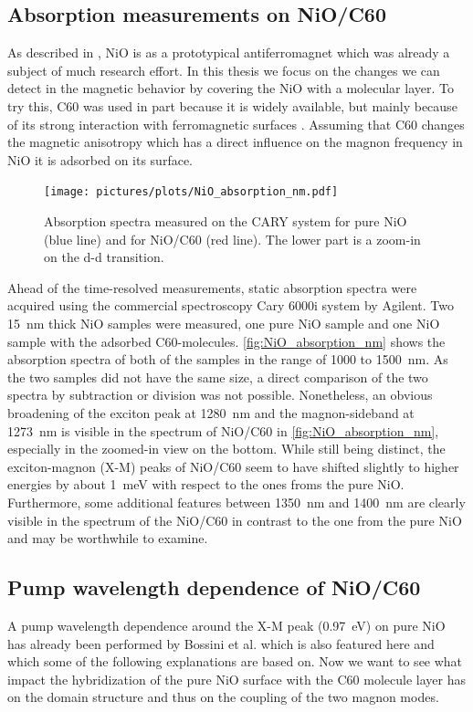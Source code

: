 \subsection{Absorption measurements on NiO/C60}
As described in , NiO is as a prototypical antiferromagnet which was already a subject of much research effort.
In this thesis we focus on the changes we can detect in the magnetic behavior by covering the NiO with a molecular layer.
To try this, C60 was used in part because it is widely available, but mainly because of its strong interaction with ferromagnetic surfaces .
Assuming that C60 changes the magnetic anisotropy which has a direct influence on the magnon frequency in NiO it is adsorbed on its surface.
\begin{figure}[ht]
    \centering
    \texttt{[image: pictures/plots/NiO\_absorption\_nm.pdf]}
    \caption{Absorption spectra measured on the CARY system for pure NiO (blue line) and for NiO/C60 (red line). The lower part is a zoom-in on the d-d transition.}
    \label{fig:NiO_absorption_nm}
\end{figure}
\FloatBarrier
Ahead of the time-resolved measurements, static absorption spectra were acquired using the commercial spectroscopy Cary 6000i system by Agilent.
Two \qty{15}{nm} thick NiO samples were measured, one pure NiO sample and one NiO sample with the adsorbed C60-molecules.
\autoref{fig:NiO_absorption_nm} shows the absorption spectra of both of the samples in the range of 1000 to \qty{1500}{nm}.
As the two samples did not have the same size, a direct comparison of the two spectra by subtraction or division was not possible.
Nonetheless, an obvious broadening of the exciton peak at \qty{1280}{nm} and the magnon-sideband at \qty{1273}{nm} is visible in the spectrum of NiO/C60 in \autoref{fig:NiO_absorption_nm}, especially in the zoomed-in view on the bottom.
While still being distinct, the exciton-magnon (X-M) peaks of NiO/C60 seem to have shifted slightly to higher energies by about \qty{1}{meV} with respect to the ones froms the pure NiO.
Furthermore, some additional features between \qty{1350}{nm} and \qty{1400}{nm} are clearly visible in the spectrum of the NiO/C60 in contrast to the one from the pure NiO and may be worthwhile to examine.

\subsection{Pump wavelength dependence of NiO/C60}
A pump wavelength dependence around the X-M peak (\qty{0.97}{eV}) on pure NiO has already been performed by Bossini et al.  which is also featured here and which some of the following explanations are based on.
Now we want to see what impact the hybridization of the pure NiO surface with the C60 molecule layer has on the domain structure and thus on the coupling of the two magnon modes.


